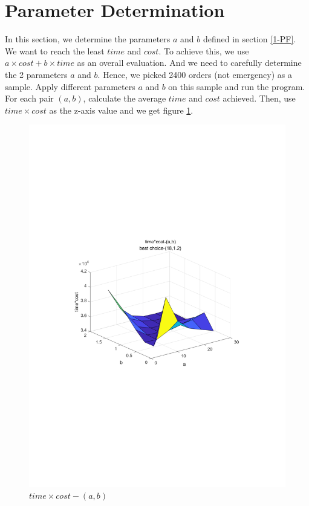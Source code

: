 \documentclass[11pt, a4paper]{article} %
\begin{document}
\section{Parameter Determination}\label{par}
In this section, we determine the parameters $a$ and $b$ defined in section \ref{1-PF}. We want to reach the least $time$ and $cost$. To achieve this, we use $a\times cost+b\times time$ as an overall evaluation. And we need to carefully determine the 2 parameters $a$ and $b$. Hence, we picked 2400 orders (not emergency) as a sample. Apply different parameters $a$ and $b$ on this sample and run the program. For each pair $(a,b)$, calculate the average $time$ and $cost$ achieved. Then, use $time\times cost$ as the z-axis value and we get figure \ref{fig:ab}.
\begin{figure}
	\centering

	\includegraphics[width=\textwidth]{figure/ab}
	\caption{$time\times cost-(a,b)$}
	\label{fig:ab}
\end{figure}
\end{document}
